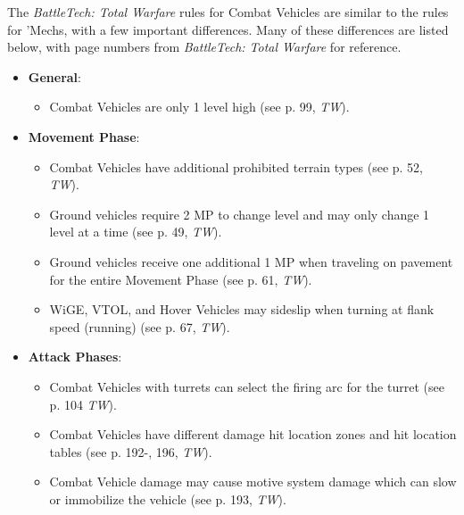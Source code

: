 The \emph{BattleTech: Total Warfare} rules for Combat Vehicles are similar to the rules for 'Mechs, with a few important differences.
Many of these differences are listed below, with page numbers from \emph{BattleTech: Total Warfare} for reference.

\begin{itemize}

  \item {\bfseries General}:

  \begin{itemize}

    \item Combat Vehicles are only 1 level high (see p. 99, \emph{TW}).

  \end{itemize}

  \item {\bfseries Movement Phase}:

  \begin{itemize}

    \item Combat Vehicles have additional prohibited terrain types (see p. 52, \emph{TW}).

    \item Ground vehicles require 2 MP to change level and may only change 1 level at a time (see p. 49, \emph{TW}).

    \item Ground vehicles receive one additional 1 MP when traveling on pavement for the entire Movement Phase (see p. 61, \emph{TW}).

    \item WiGE, VTOL, and Hover Vehicles may sideslip when turning at flank speed (running) (see p. 67, \emph{TW}).

  \end{itemize}

  \item {\bfseries Attack Phases}:

  \begin{itemize}

    \item Combat Vehicles with turrets can select the firing arc for the turret (see p. 104 \emph{TW}).

    \item Combat Vehicles have different damage hit location zones and hit location tables (see p. 192-, 196, \emph{TW}).

    \item Combat Vehicle damage may cause motive system damage which can slow or immobilize the vehicle (see p. 193, \emph{TW}).


\end{itemize}
\end{itemize}
